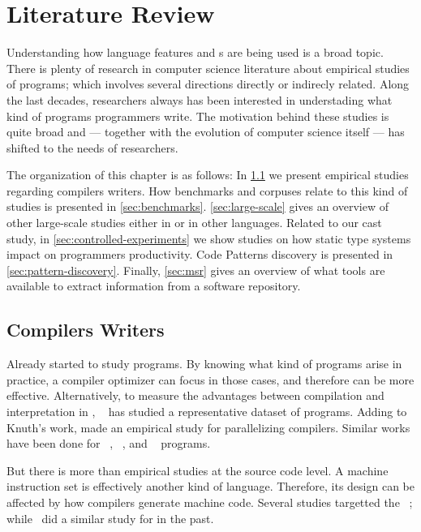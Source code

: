 
\chapter{Literature Review} \label{cha:literature-review} 

Understanding how language features and \api{}s are being used is a broad topic.
There is plenty of research in computer science literature about empirical studies of programs;
which involves several directions directly or indirecly related.
Along the last decades, researchers always has been interested in understading what kind of programs programmers write.
The motivation behind these studies is quite broad and --- together with the evolution of computer science itself --- has shifted to the needs of researchers.

The organization of this chapter is as follows:
In \cref{sec:compilers-writers} we present empirical studies regarding compilers writers.
How benchmarks and corpuses relate to this kind of studies is presented in \cref{sec:benchmarks}.
\cref{sec:large-scale} gives an overview of other large-scale studies either in \java{} or in other languages.
Related to our cast study, in \cref{sec:controlled-experiments} we show studies on how static type systems impact on programmers productivity.
Code Patterns discovery is presented in \cref{sec:pattern-discovery}.
Finally, \cref{sec:msr} gives an overview of what tools are available to extract information from a software repository.

\section{Compilers Writers} \label{sec:compilers-writers}

Already \cite{knuth_empirical_1971} started to study \fortran{} programs.
By knowing what kind of programs arise in practice, a compiler optimizer can focus in those cases, and therefore can be more effective.
Alternatively, to measure the advantages between compilation and interpretation in \basic{}, ~\cite{hammond_basic_1977} has studied a representative dataset of programs.
Adding to Knuth's work, \cite{shen_empirical_1990} made an empirical study for parallelizing compilers.
Similar works have been done for \cobol{}~\cite{salvadori_static_1975,chevance_static_1978}, \pascal{}~\cite{cook_contextual_1982}, and \apl{}~\cite{saal_properties_1975,saal_empirical_1977} programs.

But there is more than empirical studies at the source code level.
A machine instruction set is effectively another kind of language.
Therefore, its design can be affected by how compilers generate machine code.
Several studies targetted the \jvm{}~\cite{collberg_empirical_2007,odonoghue_bigram_2002,antonioli_analysis_1998}; while~\cite{cook_empirical_1989} did a similar study for \lilith{} in the past.

